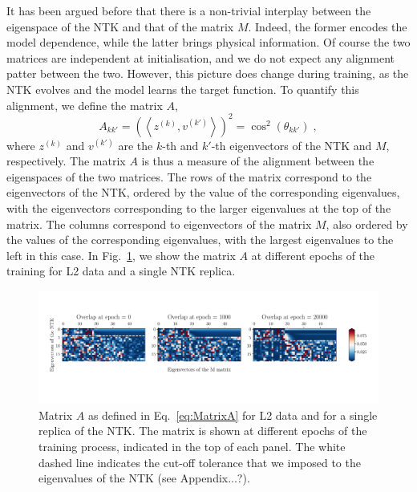 It has been argued before that there is a non-trivial interplay between the
eigenspace of the NTK and that of the matrix $M$. Indeed, the former encodes the
model dependence, while the latter brings physical information. Of course the
two matrices are independent at initialisation, and we do not expect any
alignment patter between the two. However, this picture does change during
training, as the NTK evolves and the model learns the target function. To
quantify this alignment, we define the matrix $A$, 
\begin{equation}
  \label{eq:MatrixA}
  A_{kk'} = \left( \left< z^{(k)}, v^{(k')}\right> \right)^2 = \cos^2(\theta_{kk'}) \;,
\end{equation}
where $z^{(k)}$ and $v^{(k')}$ are the $k$-th and $k'$-th eigenvectors of the
NTK and $M$, respectively. The matrix $A$ is thus a measure of the alignment
between the eigenspaces of the two matrices. The rows of the matrix correspond
to the eigenvectors of the NTK, ordered by the value of the corresponding
eigenvalues, with the eigenvectors corresponding to the larger eigenvalues at
the top of the matrix. The columns correspond to eigenvectors of the matrix $M$,
also ordered by the values of the corresponding eigenvalues, with the largest
eigenvalues to the left in this case. In Fig.~\ref{fig:NtkMAlign}, we show the
matrix $A$ at different epochs of the training for L2 data and a single NTK
replica. 
\begin{figure}[ht!]
  \centering
  \includegraphics[width=1\textwidth]{plots/ntk_pheno/ntk_alignment_L2.pdf}
  \caption{Matrix $A$ as defined in Eq.~\eqref{eq:MatrixA} for L2 data and for a
  single replica of the NTK. The matrix is shown at different epochs of the
  training process, indicated in the top of each panel. The white dashed line
  indicates the cut-off tolerance that we imposed to the eigenvalues of the NTK
  (see Appendix...?).}
  \label{fig:NtkMAlign}
\end{figure}
